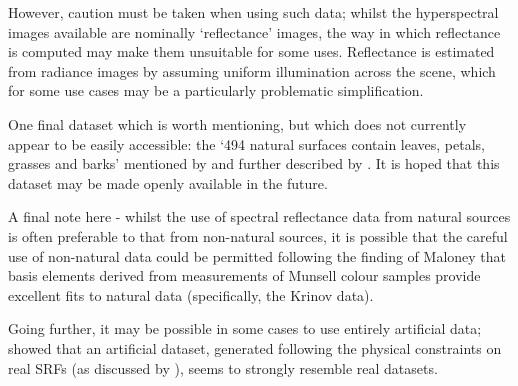 However, caution must be taken when using such data; whilst the hyperspectral images available are nominally `reflectance' images, the way in which reflectance is computed may make them unsuitable for some uses. Reflectance is estimated from radiance images by assuming uniform illumination across the scene, which for some use cases may be a particularly problematic simplification. %

One final dataset which is worth mentioning, but which does not currently appear to be easily accessible: the `494 natural surfaces contain leaves, petals, grasses and barks' mentioned by \citet{cheung_color_2004} and further described by \citet{macdonald_realistic_2014}. It is hoped that this dataset may be made openly available in the future.


A final note here - whilst the use of spectral reflectance data from natural sources is often preferable to that from non-natural sources, it is possible that the careful use of non-natural data could be permitted following the finding of Maloney \cite{maloney_evaluation_1986} that basis elements derived from measurements of Munsell colour samples provide excellent fits to natural data (specifically, the Krinov data).

Going further, it may be possible in some cases to use entirely artificial data; \citet{chen_physical_2005} showed that an artificial dataset, generated following the physical constraints on real \glspl{SRF} (as discussed by \citet{nassau_physics_2001}), seems to strongly resemble real datasets.